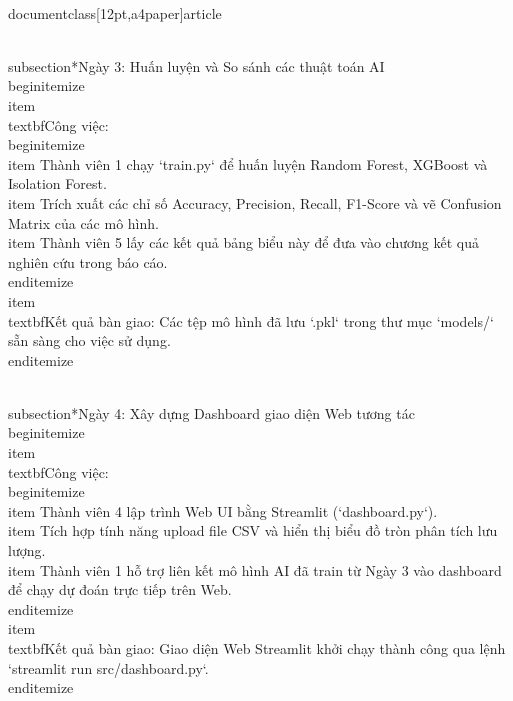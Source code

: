\\documentclass[12pt,a4paper]{article}
\begin{document}
\\subsection*{Ngày 3: Huấn luyện và So sánh các thuật toán AI}
\\begin{itemize}
    \\item \\textbf{Công việc:}
    \\begin{itemize}
        \\item Thành viên 1 chạy `train.py` để huấn luyện Random Forest, XGBoost và Isolation Forest.
        \\item Trích xuất các chỉ số Accuracy, Precision, Recall, F1-Score và vẽ Confusion Matrix của các mô hình.
        \\item Thành viên 5 lấy các kết quả bảng biểu này để đưa vào chương kết quả nghiên cứu trong báo cáo.
    \\end{itemize}
    \\item \\textbf{Kết quả bàn giao:} Các tệp mô hình đã lưu `.pkl` trong thư mục `models/` sẵn sàng cho việc sử dụng.
\\end{itemize}

\\subsection*{Ngày 4: Xây dựng Dashboard giao diện Web tương tác}
\\begin{itemize}
    \\item \\textbf{Công việc:}
    \\begin{itemize}
        \\item Thành viên 4 lập trình Web UI bằng Streamlit (`dashboard.py`).
        \\item Tích hợp tính năng upload file CSV và hiển thị biểu đồ tròn phân tích lưu lượng.
        \\item Thành viên 1 hỗ trợ liên kết mô hình AI đã train từ Ngày 3 vào dashboard để chạy dự đoán trực tiếp trên Web.
    \\end{itemize}
    \\item \\textbf{Kết quả bàn giao:} Giao diện Web Streamlit khởi chạy thành công qua lệnh `streamlit run src/dashboard.py`.
\\end{itemize}
\end{document}
